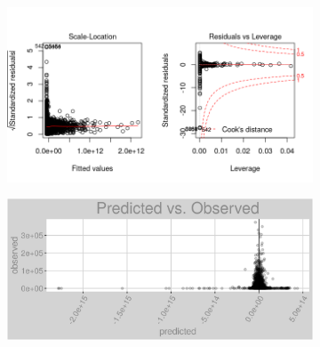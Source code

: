 \begin{figure}[h]
\centering
\begin{subfigure}{1\textwidth}
\centering
\includegraphics[width=.99\textwidth, height=0.475\textheight]{Images/electricity_l_res_2.png}
\end{subfigure}
\begin{subfigure}{1\textwidth}
\centering
\includegraphics[width=.99\textwidth, height=0.3\textheight]{Images/electricity_l_pvo.png}
\end{subfigure}
\end{figure}
\newpage
